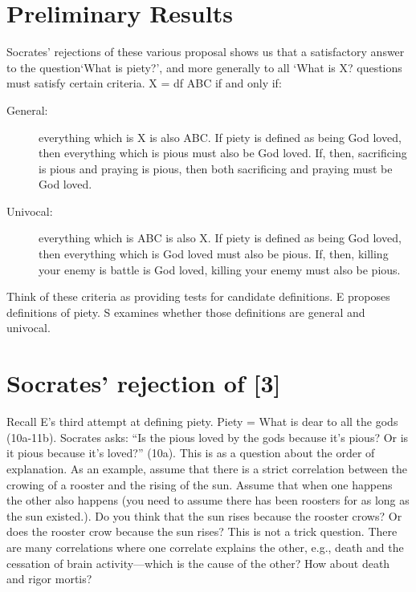 \documentclass[10 pt]{article}
\begin{document}
\section*{Preliminary Results}

Socrates' rejections of these various proposal shows us that a satisfactory answer to the question`What is piety?', and more generally to all `What is X?
 questions must satisfy certain criteria. X = df ABC if and only if: 
\begin{description}
\item[General:] everything which is X is also ABC. If piety is defined as being God loved, then everything which is pious must also be God loved. If, then, sacrificing is pious and praying is pious, then both sacrificing and praying must be God loved. 
\item[Univocal:] everything which is ABC is also X. If piety is defined as being God loved, then everything which is God loved must also be pious. If, then, killing your enemy is battle is God loved, killing your enemy must also be pious. 
\end{description}
Think of these criteria as providing tests for candidate definitions. E proposes definitions of piety. S examines whether those definitions are general and univocal. 





\section*{Socrates' rejection of [3]}
Recall E's third attempt at defining piety. Piety = What is dear to all the gods (10a-11b). Socrates asks: ``Is the pious loved by the gods because it's pious? Or is it pious because it's loved?'' (10a). This is as a question about the order of explanation. As an example, assume that there is a strict correlation between the crowing of a rooster and the rising of the sun. Assume that when one happens the other also happens (you need to assume there has been roosters for as long as the sun existed.). Do you think that the sun rises because the rooster crows? Or does the rooster crow because the sun rises? This is not a trick question. There are many correlations where one correlate explains the other, e.g., death and the cessation of brain activity---which is the cause of the other? How about death and rigor mortis?\\
\end{document}
